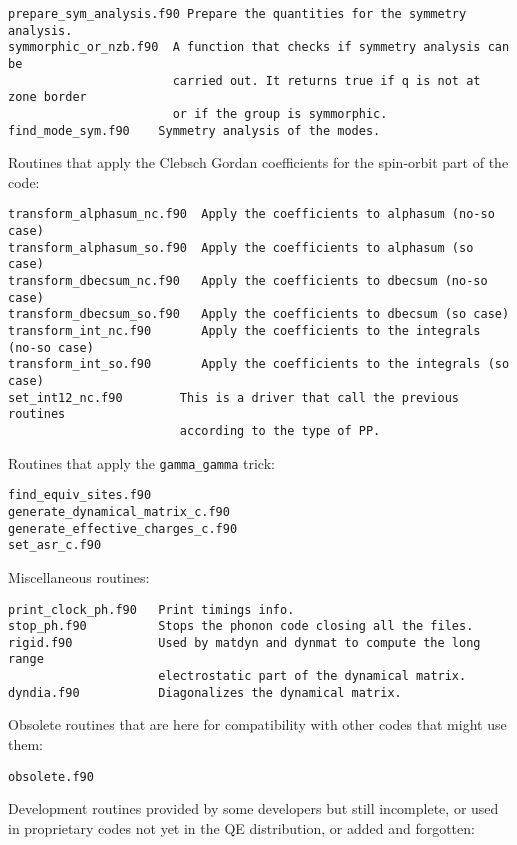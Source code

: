 \documentclass[12pt,a4paper]{article}
\begin{document}
\begin{verbatim}
prepare_sym_analysis.f90 Prepare the quantities for the symmetry analysis.
symmorphic_or_nzb.f90  A function that checks if symmetry analysis can be
                       carried out. It returns true if q is not at zone border
                       or if the group is symmorphic.
find_mode_sym.f90    Symmetry analysis of the modes.              
\end{verbatim}

Routines that apply the Clebsch Gordan coefficients for the spin-orbit
part of the code:

\begin{verbatim}
transform_alphasum_nc.f90  Apply the coefficients to alphasum (no-so case) 
transform_alphasum_so.f90  Apply the coefficients to alphasum (so case)
transform_dbecsum_nc.f90   Apply the coefficients to dbecsum (no-so case)
transform_dbecsum_so.f90   Apply the coefficients to dbecsum (so case)
transform_int_nc.f90       Apply the coefficients to the integrals (no-so case)
transform_int_so.f90       Apply the coefficients to the integrals (so case)
set_int12_nc.f90        This is a driver that call the previous routines
                        according to the type of PP.
\end{verbatim}

Routines that apply the \texttt{gamma\_gamma} trick:

\begin{verbatim}
find_equiv_sites.f90              
generate_dynamical_matrix_c.f90   
generate_effective_charges_c.f90 
set_asr_c.f90
\end{verbatim}

Miscellaneous routines:

\begin{verbatim}
print_clock_ph.f90   Print timings info.
stop_ph.f90          Stops the phonon code closing all the files.
rigid.f90            Used by matdyn and dynmat to compute the long range
                     electrostatic part of the dynamical matrix.
dyndia.f90           Diagonalizes the dynamical matrix.                        
\end{verbatim}

Obsolete routines that are here for compatibility with other codes that
might use them:

\begin{verbatim}
obsolete.f90
\end{verbatim}

Development routines provided by some developers but still incomplete,
or used in proprietary codes not yet in the QE distribution, or added and 
forgotten:
\end{document}
